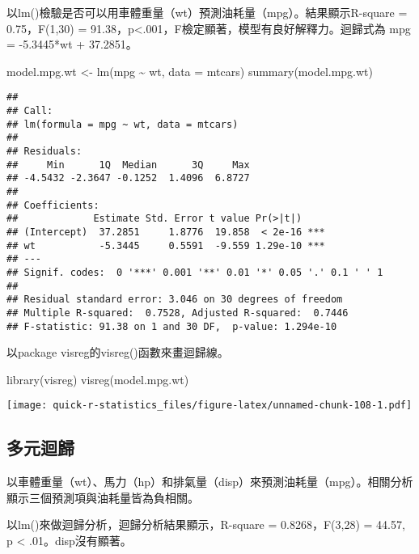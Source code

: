 \documentclass[
]{book}
\newenvironment{Shaded}{\begin{snugshade}}{\end{snugshade}}
\newcommand{\AttributeTok}[1]{\textcolor[rgb]{0.77,0.63,0.00}{#1}}
\newcommand{\FunctionTok}[1]{\textcolor[rgb]{0.00,0.00,0.00}{#1}}
\newcommand{\NormalTok}[1]{#1}
\newcommand{\OtherTok}[1]{\textcolor[rgb]{0.56,0.35,0.01}{#1}}
\newcommand{\SpecialCharTok}[1]{\textcolor[rgb]{0.00,0.00,0.00}{#1}}
\begin{document}
以lm()檢驗是否可以用車體重量（wt）預測油耗量（mpg）。結果顯示R-square = 0.75，F(1,30) = 91.38，p\textless.001，F檢定顯著，模型有良好解釋力。迴歸式為 mpg = -5.3445*wt + 37.2851。

\begin{Shaded}
\begin{Highlighting}[]
\NormalTok{model.mpg.wt }\OtherTok{\textless{}{-}} \FunctionTok{lm}\NormalTok{(mpg }\SpecialCharTok{\textasciitilde{}}\NormalTok{ wt, }\AttributeTok{data =}\NormalTok{ mtcars)}
\FunctionTok{summary}\NormalTok{(model.mpg.wt)}
\end{Highlighting}
\end{Shaded}

\begin{verbatim}
## 
## Call:
## lm(formula = mpg ~ wt, data = mtcars)
## 
## Residuals:
##     Min      1Q  Median      3Q     Max 
## -4.5432 -2.3647 -0.1252  1.4096  6.8727 
## 
## Coefficients:
##             Estimate Std. Error t value Pr(>|t|)    
## (Intercept)  37.2851     1.8776  19.858  < 2e-16 ***
## wt           -5.3445     0.5591  -9.559 1.29e-10 ***
## ---
## Signif. codes:  0 '***' 0.001 '**' 0.01 '*' 0.05 '.' 0.1 ' ' 1
## 
## Residual standard error: 3.046 on 30 degrees of freedom
## Multiple R-squared:  0.7528, Adjusted R-squared:  0.7446 
## F-statistic: 91.38 on 1 and 30 DF,  p-value: 1.294e-10
\end{verbatim}

以package visreg的visreg()函數來畫迴歸線。

\begin{Shaded}
\begin{Highlighting}[]
\FunctionTok{library}\NormalTok{(visreg)}
\FunctionTok{visreg}\NormalTok{(model.mpg.wt)}
\end{Highlighting}
\end{Shaded}

\texttt{[image: quick-r-statistics\_files/figure-latex/unnamed-chunk-108-1.pdf]}

\hypertarget{ux591aux5143ux8ff4ux6b78}{%
\subsection{多元迴歸}\label{ux591aux5143ux8ff4ux6b78}}

以車體重量（wt）、馬力（hp）和排氣量（disp）來預測油耗量（mpg）。相關分析顯示三個預測項與油耗量皆為負相關。

以lm()來做迴歸分析，迴歸分析結果顯示，R-square = 0.8268，F(3,28) = 44.57, p \textless{} .01。disp沒有顯著。
\end{document}
